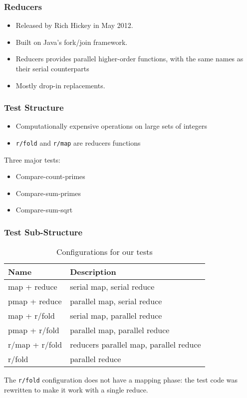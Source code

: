 \documentclass{beamer}
\newcommand{\clocode}[1]{{\texttt {#1}}}
\begin{document}
\begin{frame}[fragile]
\frametitle{Reducers}
	\begin{itemize}
	 \item Released by Rich Hickey in May 2012.
	 \item Built on Java's fork/join framework.
	 \item Reducers provides parallel higher-order functions, with the same names as their serial counterparts
	 \item Mostly drop-in replacements.
	\end{itemize}
\end{frame}
\begin{frame}
\frametitle{Test Structure}
	\begin{itemize}
	\item Computationally expensive operations on large sets of integers
	\item \clocode{r/fold} and \clocode{r/map} are reducers functions
	\end{itemize}
	Three major tests:
	\begin{itemize}
	\item Compare-count-primes
	\item Compare-sum-primes
	\item Compare-sum-sqrt
	\end{itemize}
\end{frame}
\begin{frame}
\frametitle{Test Sub-Structure}
\begin{table}
\begin{center}
\begin{tabular}{|l|l|}
\hline 
Name & Description \\
\hline
map + reduce & serial map, serial reduce \\
pmap + reduce & parallel map, serial reduce \\
map + r/fold & serial map, parallel reduce \\
pmap + r/fold & parallel map, parallel reduce\\
r/map + r/fold & reducers parallel map, parallel reduce\\
r/fold & parallel reduce\\
\hline
\end{tabular}
\end{center}
\caption{Configurations for our tests}\label{table:tests}
\end{table}
The \clocode{r/fold} configuration does not have a mapping phase: the test code was rewritten to make it work with a single reduce.
\end{frame}
\end{document}
